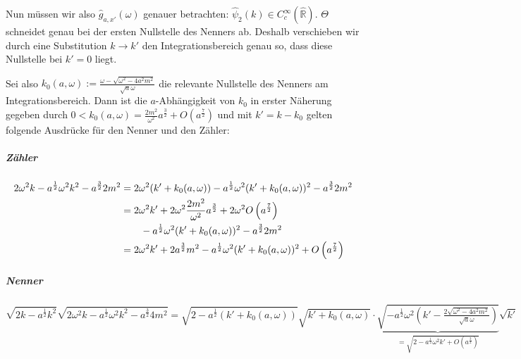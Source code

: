 Nun müssen wir also $\hat g_{a,x'}(\omega)$ genauer betrachten: $\hat\psi_2(k) \in C^\infty_c(\mathbb{\hat R})$. $\Theta$ schneidet genau bei der ersten Nullstelle des Nenners ab. Deshalb verschieben wir durch eine Substitution $k \rightarrow k'$ den Integrationsbereich genau so, dass diese Nullstelle bei $k' = 0$ liegt.

Sei also $k_0(a,\omega) := \frac{\omega-\sqrt{\omega^2 - 4a^2m^2}}{\sqrt{a}\omega}$ die relevante Nullstelle des Nenners am Integrationsbereich.
Dann ist die $a$-Abhängigkeit von $k_0$ in erster Näherung gegeben durch $0 < k_0(a,\omega) = \frac{2m^2}{\omega^2}a^{\frac{3}{2}} + O\left(a^{\frac{7}{2}}\right)$
und mit $k'=k-k_0$ gelten folgende Ausdrücke für den Nenner und den Zähler:

\subparagraph*{Zähler}
\begin{align*}
    2 \omega^2k-a^{\frac{1}{2}} \omega^2 k^2-a^{\frac{3}{2}}2m^2
    &=
    2\omega^2(k'+k_0(a,\omega))-a^{\frac{1}{2}}\omega^2(k'+k_0(a,\omega))^2-a^{\frac{3}{2}}2m^2
    \\ &=
    2 \omega^2 k' + 2 \omega^2 \frac{2m^2}{\omega^2} a^{\frac{3}{2}}
        + 2 \omega^2 O\left(a^{\frac{7}{2}}\right)
        \\  &\kern 2em-  a^{\frac{1}{2}} \omega^2(k'+k_0(a,\omega))^2
        -a^{\frac{3}{2}}2m^2
    \\ &=
    2 \omega^2k'+2a^{\frac{3}{2}}m^2-a^{\frac{1}{2}}\omega^2(k'+k_0(a,\omega))^2
        + O\left(a^{\frac{7}{2}}\right)
\end{align*}

\subparagraph*{Nenner}
\begin{dmath*}
    \sqrt{2 k-a^{\frac{1}{2}}k^2}
    \sqrt{2 \omega^2k-a^{\frac{1}{2}}\omega^2k^2-a^{\frac{3}{2}}4m^2}
    =
    \sqrt{2-a^{\frac{1}{2}}(k'+k_0(a,\omega))} \sqrt{k'+k_0(a,\omega)}
    \cdot
    \underbrace{
    \sqrt{
            -a^{\frac{1}{2}}\omega^2\left(k'-\tfrac{2\sqrt{\omega^2-4a^2m^2}}
                    {\sqrt a \omega}\right)
        }
    }_{= \sqrt{2-a^{\frac{1}{2}}\omega^2 k' + O\left(a^{\frac{3}{2}}\right)}}
    \sqrt{k'}
\end{dmath*}

